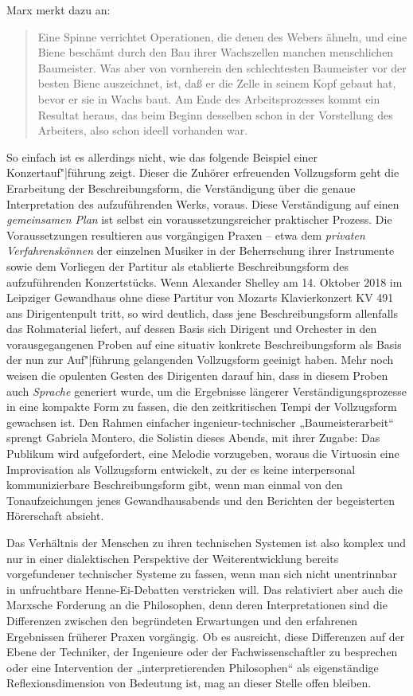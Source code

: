 \documentclass[11pt,a4paper]{article}
\begin{document}
Marx \cite[S. 193]{MEW23} merkt dazu an:
\begin{quote}
  Eine Spinne verrichtet Operationen, die denen des Webers ähneln, und eine
  Biene beschämt durch den Bau ihrer Wachszellen manchen menschlichen
  Baumeister. Was aber von vornherein den schlechtesten Baumeister vor der
  besten Biene auszeichnet, ist, daß er die Zelle in seinem Kopf gebaut hat,
  bevor er sie in Wachs baut. Am Ende des Arbeitsprozesses kommt ein Resultat
  heraus, das beim Beginn desselben schon in der Vorstellung des Arbeiters,
  also schon ideell vorhanden war.
\end{quote}
So einfach ist es allerdings nicht, wie das folgende Beispiel einer
Konzertauf"|führung zeigt. Dieser die Zuhörer erfreuenden Vollzugsform geht
die Erarbeitung der Beschreibungsform, die Verständigung über die genaue
Interpretation des aufzuführenden Werks, voraus. Diese Verständigung auf einen
\emph{gemeinsamen Plan} ist selbst ein voraussetzungsreicher praktischer
Prozess.  Die Voraussetzungen resultieren aus vorgängigen Praxen -- etwa dem
\emph{privaten Verfahrenskönnen} der einzelnen Musiker in der Beherrschung
ihrer Instrumente sowie dem Vorliegen der Partitur als etablierte
Beschreibungsform des aufzuführenden Konzertstücks.  Wenn Alexander Shelley am
14. Oktober 2018 im Leipziger Gewandhaus ohne diese Partitur von Mozarts
Klavierkonzert KV 491 ans Dirigentenpult tritt, so wird deutlich, dass jene
Beschreibungsform allenfalls das Rohmaterial liefert, auf dessen Basis sich
Dirigent und Orchester in den vorausgegangenen Proben auf eine situativ
konkrete Beschreibungsform als Basis der nun zur Auf"|führung gelangenden
Vollzugsform geeinigt haben. Mehr noch weisen die opulenten Gesten des
Dirigenten darauf hin, dass in diesem Proben auch \emph{Sprache} generiert
wurde, um die Ergebnisse längerer Verständigungsprozesse in eine kompakte Form
zu fassen, die den zeitkritischen Tempi der Vollzugsform gewachsen ist.  Den
Rahmen einfacher ingenieur-technischer „Baumeisterarbeit“ sprengt Gabriela
Montero, die Solistin dieses Abends, mit ihrer Zugabe: Das Publikum wird
aufgefordert, eine Melodie vorzugeben, woraus die Virtuosin eine Improvisation
als Vollzugsform entwickelt, zu der es keine interpersonal kommunizierbare
Beschreibungsform gibt, wenn man einmal von den Tonaufzeichungen jenes
Gewandhausabends und den Berichten der begeisterten Hörerschaft absieht.

Das Verhältnis der Menschen zu ihren technischen Systemen ist also komplex und
nur in einer dialektischen Perspektive der Weiterentwicklung bereits
vorgefundener technischer Systeme zu fassen, wenn man sich nicht unentrinnbar
in unfruchtbare Henne-Ei-Debatten verstricken will.  Das relativiert aber auch
die Marxsche Forderung an die Philosophen, denn deren Interpretationen sind
die Differenzen zwischen den begründeten Erwartungen und den erfahrenen
Ergebnissen früherer Praxen vorgängig. Ob es ausreicht, diese Differenzen auf
der Ebene der Techniker, der Ingenieure oder der Fachwissenschaftler zu
besprechen oder eine Intervention der „interpretierenden Philosophen“ als
eigenständige Reflexionsdimension von Bedeutung ist, mag an dieser Stelle
offen bleiben. 
\end{document}
